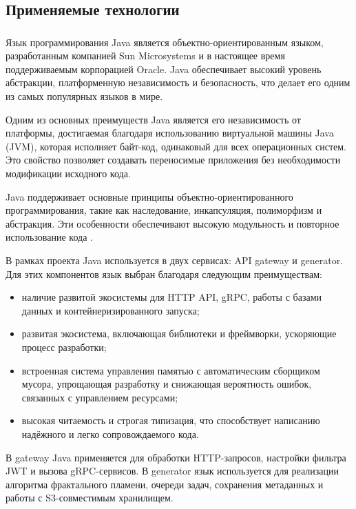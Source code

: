 \subsection{Применяемые технологии}

\subsubsection{}

Язык программирования Java является объектно-ориентированным языком, разработанным компанией Sun Microsystems и в настоящее время поддерживаемым корпорацией Oracle. Java обеспечивает высокий уровень абстракции, платформенную независимость и безопасность, что делает его одним из самых популярных языков в мире.

Одним из основных преимуществ Java является его независимость от платформы, достигаемая благодаря использованию виртуальной машины Java (JVM), которая исполняет байт-код, одинаковый для всех операционных систем. Это свойство позволяет создавать переносимые приложения без необходимости модификации исходного кода.

Java поддерживает основные принципы объектно-ориентированного программирования, такие как наследование, инкапсуляция, полиморфизм и абстракция. Эти особенности обеспечивают высокую модульность и повторное использование кода \cite{java}.

В рамках проекта Java используется в двух сервисах: API gateway и generator. Для этих компонентов язык выбран благодаря следующим преимуществам:
\begin{itemize}
  \item наличие развитой экосистемы для HTTP API, gRPC, работы с базами данных и контейнеризированного запуска;
  \item развитая экосистема, включающая библиотеки и фреймворки, ускоряющие процесс разработки;
  \item встроенная система управления памятью с автоматическим сборщиком мусора, упрощающая разработку и снижающая вероятность ошибок, связанных с управлением ресурсами;
  \item высокая читаемость и строгая типизация, что способствует написанию надёжного и легко сопровождаемого кода.
\end{itemize}

В gateway Java применяется для обработки HTTP-запросов, настройки фильтра JWT и вызова gRPC-сервисов. В generator язык используется для реализации алгоритма фрактального пламени, очереди задач, сохранения метаданных и работы с S3-совместимым хранилищем.

